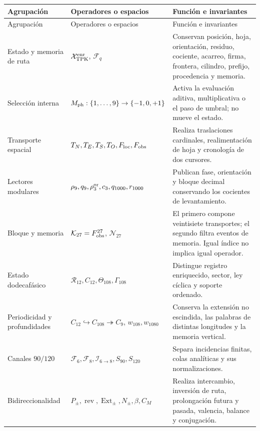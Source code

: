 \begingroup
\small
\renewcommand{\arraystretch}{1.12}
\begin{longtable}{@{}p{}p{}p{}@{}}
\toprule
Agrupación&Operadores o espacios&Función e invariantes\\
\midrule
\endfirsthead
\toprule
Agrupación&Operadores o espacios&Función e invariantes\\
\midrule
\endhead
Estado y memoria de ruta&
\(\mathcal X_{\rm TPK}^{\rm enr}\), \(\mathcal F_q\)&
Conservan posición, hoja, orientación, residuo, cociente, acarreo, firma,
frontera, cilindro, prefijo, procedencia y memoria.\\

Selección interna&
\(M_{\rm ph}:\{1,\ldots,9\}\to\{-1,0,+1\}\)&
Activa la evaluación aditiva, multiplicativa o el paso de umbral; no mueve
el estado.\\

Transporte espacial&
\(T_N,T_E,T_S,T_O,F_{\rm loc},F_{\rm obs}\)&
Realiza traslaciones cardinales, realimentación de hoja y cronología de dos
cursores.\\

Lectores modulares&
\(\rho_9,q_9,\rho_3^{\rm or},c_3,q_{1000},r_{1000}\)&
Publican fase, orientación y bloque decimal conservando los cocientes de
levantamiento.\\

Bloque y memoria&
\(\mathcal K_{27}=F_{\rm obs}^{27}\), \(\mathcal N_{27}\)&
El primero compone veintisiete transportes; el segundo filtra eventos de
memoria. Igual índice no implica igual operador.\\

Estado dodecafásico&
\(\mathcal R_{12},C_{12},\Theta_{108},\Gamma_{108}\)&
Distingue registro enriquecido, sector, ley cíclica y soporte ordenado.\\

Periodicidad y profundidades&
\(C_{12}\hookrightarrow C_{108}\twoheadrightarrow C_9\),
\(w_{108},w_{1080}\)&
Conserva la extensión no escindida, las palabras de distintas longitudes y
la memoria vertical.\\

Canales \(90/120\)&
\(\mathcal F_6,\mathcal F_8,\mathcal I_{6\to8},
S_{90},S_{120}\)&
Separa incidencias finitas, colas analíticas y sus normalizaciones.\\

Bidireccionalidad&
\(P_\pm,\operatorname{rev},\operatorname{Ext}_\pm,
N_\pm,\beta,C_M\)&
Realiza intercambio, inversión de ruta, prolongación futura y pasada,
valencia, balance y conjugación.\\


\end{longtable}
